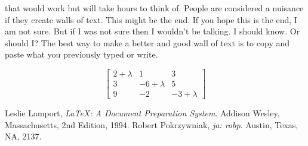 \documentclass[11pt]{article}
\begin{document}
\begin{center}
that would work but will take hours to think of. People are considered a nuisance if they create walls of text. This might be the end. If you hope this is the end, I am not sure. But if I was not sure then I wouldn't be talking. I should know.
\cite{RobertP} Or should I? The best way to make a better and good wall of text is to copy and paste what you previously typed or write.
\end{center}
\newpage
$$\left[\begin{array}{ccc}
2+\lambda&1&3\\
3&-6+\lambda&5\\
9&-2&-3+\lambda
\end{array}\right]$$

\begin{thebibliography}{9}
 
  Leslie Lamport,
  \emph{\LaTeX: A Document Preparation System}.
  Addison Wesley, Massachusetts,
  2nd Edition,
  1994.
  Robert Pokrzywniak,
  \emph{ja: robp}.
  Austin, Texas,
  NA,
  2137.
 
\end{thebibliography}
 
 
 
 
\end{document}
